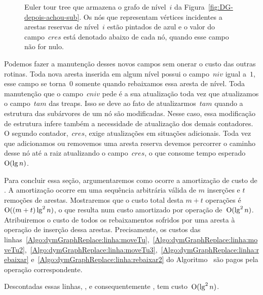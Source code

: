 \begin{figure}[htb]
\scalebox{.61}{
\centering
}
\caption{Euler tour tree que armazena o grafo de nível~$i$ da Figura~\ref{fig:DG-depois-achou-sub}. Os nós que representam vértices incidentes a arestas reservas de nível~$i$ estão pintados de azul e o valor do campo~$cres$ está denotado abaixo de cada nó, quando esse campo não for nulo.}
\label{fig:DG-TREAP-res}
\end{figure}

Podemos fazer a manutenção desses novos campos sem onerar o custo das outras rotinas.
Toda nova aresta inserida em algum nível possui o campo~$niv$ igual a~$1$, esse campo se torna~$0$ somente quando rebaixamos essa aresta de nível.
Toda manutenção que o campo~$cniv$ pede é a sua atualização toda vez que atualizamos o campo~$tam$ das treaps.
Isso se deve ao fato de atualizarmos~$tam$ quando a estrutura das subárvores de um nó são modificadas.
Nesse caso, essa modificação de estrutura infere também a necessidade de atualização dos demais contadores.
O segundo contador,~$cres$, exige atualizações em situações adicionais.
Toda vez que adicionamos ou removemos uma aresta reserva devemos percorrer o caminho desse nó até a raiz atualizando o campo~$cres$, o que consome tempo esperado~$\mathrm{O}(\lg n)$.

Para concluir essa seção, argumentaremos como ocorre a amortização de custo de \dymGraphDelEdge{}. 
A amortização ocorre em uma sequência arbitrária válida de $m$ inserções e $t$ remoções de arestas.
Mostraremos que o custo total desta $m+t$ operações é~$\mathrm{O}((m+t)\lg^2 n)$,
o que resulta num custo amortizado por operação de~$\mathrm{O}(\lg^2 n)$.
Atribuiremos o custo de todos os rebaixamentos sofridos por uma aresta à operação de inserção dessa arestas.
Precisamente, os custos das linhas~\ref{Algo:dymGraphReplace:linha:moveTu},~\ref{Algo:dymGraphReplace:linha:moveTu2},~\ref{Algo:dymGraphReplace:linha:moveTu3},~\ref{Algo:dymGraphReplace:linha:rebaixar} e~\ref{Algo:dymGraphReplace:linha:rebaixar2} do Algoritmo~\dymGraphReplace{} são pagos pela operação \dymGraphAddEdge{} correspondente.

Descontadas essas linhas, \dymGraphReplace{}, e consequentemente \dymGraphDelEdge{}, tem custo~$\mathrm{O}(\lg^2 n)$.

